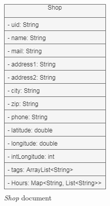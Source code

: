 \begin{figure}[H]
  \centering
  \begin{minipage}[b]{0.3\textwidth}
    \includegraphics[width=\textwidth]{Img/ShopDocument}
	\caption{\emph{Shop} document}
	  \label{fig:ShopDocument}
  \end{minipage}
  \hfill
  \begin{minipage}[b]{0.3\textwidth}

\end{minipage}
\end{figure}
